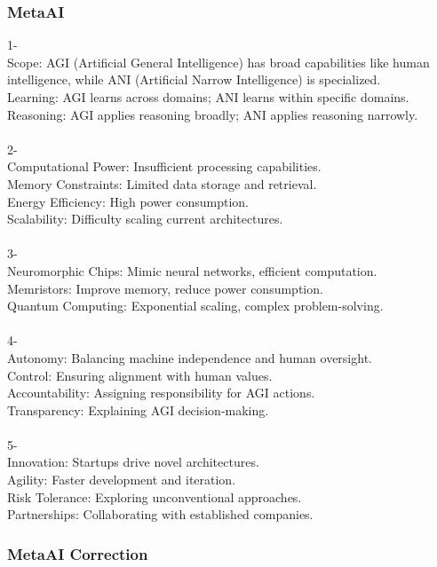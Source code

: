 \subsubsection{MetaAI}
\begin{tcolorbox}[breakable]
1-\\
Scope: AGI (Artificial General Intelligence) has broad capabilities like human intelligence, while ANI (Artificial Narrow Intelligence) is specialized.\\
Learning: AGI learns across domains; ANI learns within specific domains.\\
Reasoning: AGI applies reasoning broadly; ANI applies reasoning narrowly.\\
\\
2-\\
Computational Power: Insufficient processing capabilities.\\
Memory Constraints: Limited data storage and retrieval.\\
Energy Efficiency: High power consumption.\\
Scalability: Difficulty scaling current architectures.\\
\\
3-\\
Neuromorphic Chips: Mimic neural networks, efficient computation.\\
Memristors: Improve memory, reduce power consumption.\\
Quantum Computing: Exponential scaling, complex problem-solving.\\
\\
4-\\
Autonomy: Balancing machine independence and human oversight.\\
Control: Ensuring alignment with human values.\\
Accountability: Assigning responsibility for AGI actions.\\
Transparency: Explaining AGI decision-making.\\
\\
5-\\
Innovation: Startups drive novel architectures.\\
Agility: Faster development and iteration.\\
Risk Tolerance: Exploring unconventional approaches.\\
Partnerships: Collaborating with established companies.\\
\end{tcolorbox}
\subsubsection{MetaAI Correction}
\begin{tcolorbox}[breakable]
    
\end{tcolorbox}



